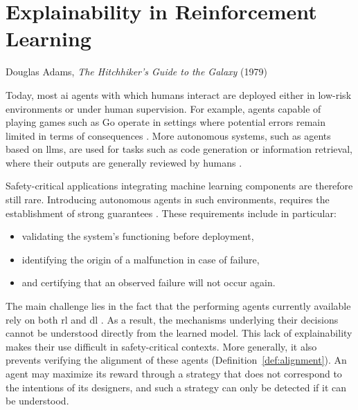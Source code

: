 \chapter{Explainability in Reinforcement Learning}
\label{chap:explainability_in_reinforcement_learning}

{Douglas Adams, \textit{The Hitchhiker's Guide to the Galaxy} (1979)~\parencite{adams1979hitchhiker}}

\chaptercontents

\glsresetall

Today, most \gls{ai} agents with which humans interact are deployed either in low-risk environments or under human supervision.
For example, agents capable of playing games such as Go operate in settings where potential errors remain limited in terms of consequences \parencite{silver2017mastering}.
More autonomous systems, such as agents based on \glspl{llm}, are used for tasks such as code generation or information retrieval, where their outputs are generally reviewed by humans \parencite{chen2021evaluating, lewis2021retrievalaugmentedgenerationknowledgeintensivenlp}.

Safety-critical applications integrating machine learning components are therefore still rare.
Introducing autonomous agents in such environments, requires the establishment of strong guarantees \parencite{seshia2022toward}.
These requirements include in particular:
\begin{itemize}
    \item validating the system's functioning before deployment,
    \item identifying the origin of a malfunction in case of failure,
    \item and certifying that an observed failure will not occur again.
\end{itemize}

The main challenge lies in the fact that the performing agents currently available rely on both \gls{rl} and \gls{dl} \parencite{mnih2013playingatarideepreinforcement}.
As a result, the mechanisms underlying their decisions cannot be understood directly from the learned model.
This lack of explainability makes their use difficult in safety-critical contexts.
More generally, it also prevents verifying the alignment of these agents (Definition~\ref{def:alignment}).
An agent may maximize its reward through a strategy that does not correspond to the intentions of its designers, and such a strategy can only be detected if it can be understood.

